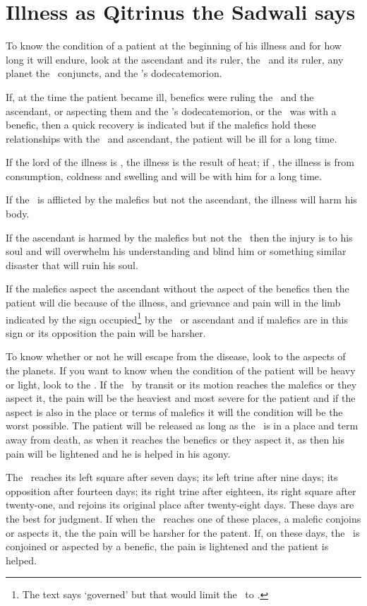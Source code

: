 \section{Illness as Qitrinus the Sadwali says}
To know the condition of a patient at the beginning of his illness and for how long it will endure, look at the ascendant and its ruler, the \Moon\, and its ruler, any planet the \Moon\, conjuncts, and the \Moon's dodecatemorion.

If, at the time the patient became ill, benefics were ruling the \Moon\, and the ascendant, or aspecting them and the \Moon's dodecatemorion, or the \Moon\, was with a benefic, then a quick recovery is indicated but if the malefics hold these relationships with the \Moon\, and ascendant, the patient will be ill for a long time.

If the lord of the illness is \Mars, the illness is the result of heat; if \Saturn, the illness is from consumption, coldness and swelling and will be with him for a long time.

If the \Moon\, is afflicted by the malefics but not the ascendant, the illness will harm his body.

If the ascendant is harmed by the malefics but not the \Moon\, then the injury is to his soul and will overwhelm his understanding and blind him or something similar disaster that will ruin his soul.

If the malefics aspect the ascendant without the aspect of the benefics then the patient will die because of the illness, and grievance and pain will in the limb indicated by the sign occupied\footnote{The text says `governed' but that would limit the \Moon\, to \Cancer.} by the \Moon\, or ascendant and if malefics are in this sign or its opposition the pain will be harsher.

To know whether or not he will escape from the disease, look to the aspects of the planets. If you want to know when the condition of the patient will be heavy or light, look to the \Moon. If the \Moon\, by transit or its motion reaches the malefics or they aspect it, the pain will be the heaviest and most severe for the patient and if the aspect is also in the place or terms of malefics it will the condition will be the worst possible. The patient will be released as long as the \Moon\, is in a place and term away from death, as when it reaches the benefics or they aspect it, as then his pain will be lightened and he is helped in his agony.

The \Moon\, reaches its left square after seven days; its left trine after nine days; its opposition after fourteen days; its right trine after eighteen, its right square after twenty-one, and rejoins its original place after twenty-eight days. These days are the best for judgment. If when the \Moon\, reaches one of these places, a malefic conjoins or aspects it, the the pain will be harsher for the patent. If, on these days, the \Moon\, is conjoined or aspected by a benefic, the pain is lightened and the patient is helped.

